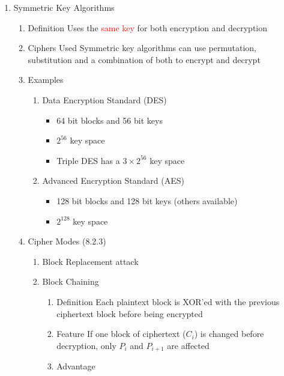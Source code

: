 \documentclass[a4paper,10pt]{article}
\newcommand{\red}[1]{\textcolor{red}{#1}}
\begin{document}
\begin{enumerate}
  \item Symmetric Key Algorithms
    \begin{enumerate}
      \item Definition
        \newline Uses the \red{same key} for both encryption and decryption
      \item Ciphers Used
        \newline Symmetric key algorithms can use permutation, substitution and a combination of both to encrypt and decrypt
      \item Examples
        \begin{enumerate}
          \item Data Encryption Standard (DES)
            \begin{itemize}
              \item 64 bit blocks and 56 bit keys
              \item $ 2^{56} $ key space
              \item Triple DES has a $ 3\times 2^{56} $ key space
            \end{itemize}
          \item Advanced Encryption Standard (AES)
            \begin{itemize}
              \item 128 bit blocks and 128 bit keys (others available)
              \item $ 2^{128} $ key space
            \end{itemize}
        \end{enumerate}
      \item Cipher Modes (8.2.3)
        \begin{enumerate}
          \item Block
            \newline Replacement attack
          \item Block Chaining
            \begin{enumerate}
              \item Definition
                \newline Each plaintext block is XOR'ed with the previous ciphertext block before being encrypted
              \item Feature
                \newline If one block of ciphertext ($ C_i $) is changed before decryption, only $ P_i $ and $ P_{i+1} $ are affected
              \item Advantage

\end{enumerate}
\end{enumerate}
\end{enumerate}
\end{enumerate}
\end{document}

